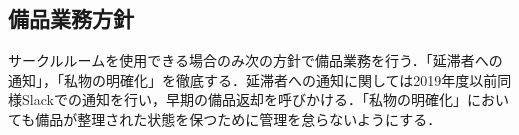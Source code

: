 \subsection*{備品業務方針}

サークルルームを使用できる場合のみ次の方針で備品業務を行う．「延滞者への通知」，「私物の明確化」を徹底する．延滞者への通知に関しては2019年度以前同様Slackでの通知を行い，早期の備品返却を呼びかける．「私物の明確化」においても備品が整理された状態を保つために管理を怠らないようにする．